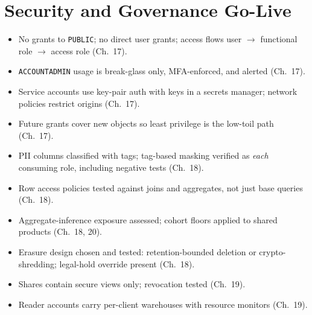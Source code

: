 \section{Security and Governance Go-Live}
\begin{itemize}
    \item[$\square$] No grants to \texttt{PUBLIC}; no direct user grants; access flows user $\rightarrow$ functional role $\rightarrow$ access role (Ch.~17).
    \item[$\square$] \texttt{ACCOUNTADMIN} usage is break-glass only, MFA-enforced, and alerted (Ch.~17).
    \item[$\square$] Service accounts use key-pair auth with keys in a secrets manager; network policies restrict origins (Ch.~17).
    \item[$\square$] Future grants cover new objects so least privilege is the low-toil path (Ch.~17).
    \item[$\square$] PII columns classified with tags; tag-based masking verified as \emph{each} consuming role, including negative tests (Ch.~18).
    \item[$\square$] Row access policies tested against joins and aggregates, not just base queries (Ch.~18).
    \item[$\square$] Aggregate-inference exposure assessed; cohort floors applied to shared products (Ch.~18, 20).
    \item[$\square$] Erasure design chosen and tested: retention-bounded deletion or crypto-shredding; legal-hold override present (Ch.~18).
    \item[$\square$] Shares contain secure views only; revocation tested (Ch.~19).
    \item[$\square$] Reader accounts carry per-client warehouses with resource monitors (Ch.~19).
\end{itemize}

